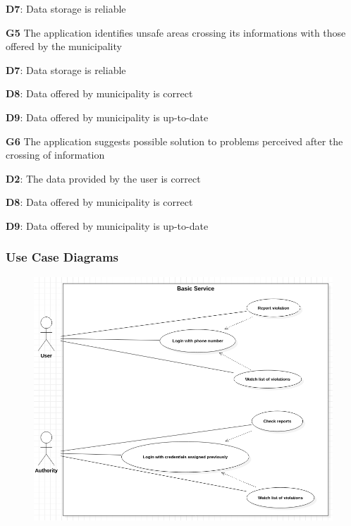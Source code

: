 \begin{outline}
\2 \textbf{D7}: Data storage is reliable


\1  \textbf{G5} The application identifies unsafe areas crossing its informations with those offered by the municipality

\2 \textbf{D7}: Data storage is reliable

\2 \textbf{D8}: Data offered by municipality is correct

\2 \textbf{D9}: Data offered by municipality is up-to-date



\1  \textbf{G6} The application suggests possible solution to problems perceived after the crossing of information

\2 \textbf{D2}: The data provided by the user is correct

\2 \textbf{D8}: Data offered by municipality is correct

\2 \textbf{D9}: Data offered by municipality is up-to-date

\end{outline}

\subsubsection{Use Case Diagrams}
\begin{figure}
[H]
\includegraphics[width=\textwidth]{Images/Diagrams/UseCase1.png}
\end{figure}

